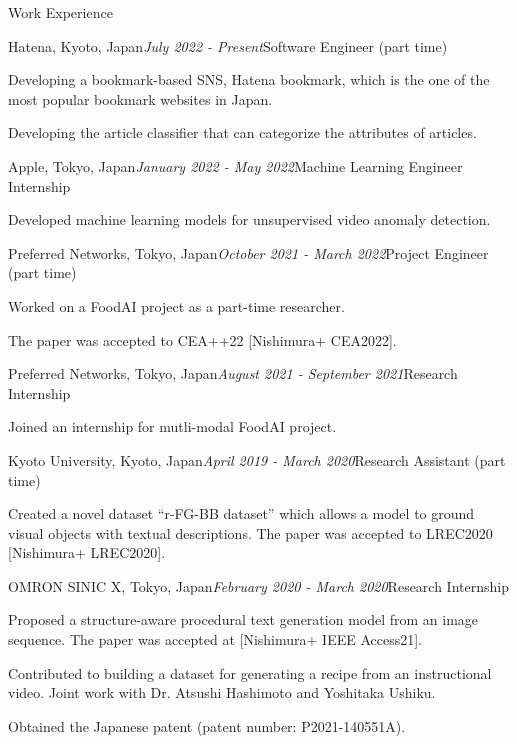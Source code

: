 \begin{rSection}{Work Experience}
\begin{rSubsection}{Hatena, Kyoto, Japan}{\em July 2022 - Present}{Software Engineer (part time)}{}
\item Developing a bookmark-based SNS, Hatena bookmark, which is the one of the most popular bookmark websites in Japan.
\item Developing the article classifier that can categorize the attributes of articles.
\end{rSubsection}

\begin{rSubsection}{Apple, Tokyo, Japan}{\em January 2022 - May 2022}{Machine Learning Engineer Internship}{}
\item Developed machine learning models for unsupervised video anomaly detection.
\end{rSubsection}

\begin{rSubsection}{Preferred Networks, Tokyo, Japan}{\em October 2021 - March 2022}{Project Engineer (part time)}{}
\item Worked on a FoodAI project as a part-time researcher.
\item The paper was accepted to CEA++22 [Nishimura+ CEA2022].
\end{rSubsection}

\begin{rSubsection}{Preferred Networks, Tokyo, Japan}{\em August 2021 - September 2021}{Research Internship}{}
\item Joined an internship for mutli-modal FoodAI project.
\end{rSubsection}

\begin{rSubsection}{Kyoto University, Kyoto, Japan}{\em April 2019 - March 2020}{Research Assistant (part time)}{}
\item Created a novel dataset ``r-FG-BB dataset'' which allows a model to ground visual objects with textual descriptions. The paper was accepted to LREC2020 [Nishimura+ LREC2020].
\end{rSubsection}

\begin{rSubsection}{OMRON SINIC X, Tokyo, Japan}{\em February 2020 - March 2020}{Research Internship}{}
\item Proposed a structure-aware procedural text generation model from an image sequence. The paper was accepted at [Nishimura+ IEEE Access21].
\item Contributed to building a dataset for generating a recipe from an instructional video. Joint work with Dr. Atsushi Hashimoto and Yoshitaka Ushiku.
\item Obtained the Japanese patent (patent number: P2021-140551A).
\end{rSubsection}


\end{rSection}
